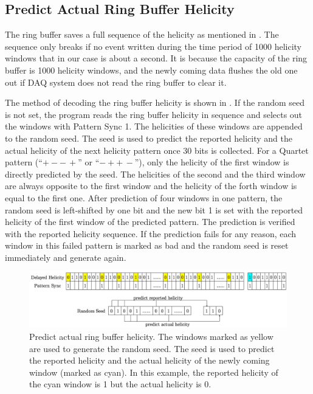\subsection{Predict Actual Ring Buffer Helicity}
\label{A2S2SS1}

The ring buffer saves a full sequence of the helicity as mentioned in . The sequence only breaks if no event written during the time period of 1000 helicity windows that in our case is about a second. It is because the capacity of the ring buffer is 1000 helicity windows, and the newly coming data flushes the old one out if DAQ system does not read the ring buffer to clear it.

The method of decoding the ring buffer helicity is shown in . If the random seed is not set, the program reads the ring buffer helicity in sequence and selects out the windows with Pattern Sync 1. The helicities of these windows are appended to the random seed. The seed is used to predict the reported helicity and the actual helicity of the next helicity pattern once 30 bits is collected. For a Quartet pattern (``$+--\,+$'' or ``$-++\,-$''), only the helicity of the first window is directly predicted by the seed. The helicities of the second and the third window are always opposite to the first window and the helicity of the forth window is equal to the first one. After prediction of four windows in one pattern, the random seed is left-shifted by one bit and the new bit 1 is set with the reported helicity of the first window of the predicted pattern. The prediction is verified with the reported helicity sequence. If the prediction fails for any reason, each window in this failed pattern is marked as bad and the random seed is reset immediately and generate again.

\begin{figure}[tb!]
  \centering
  \includegraphics[width=\textwidth]{figs/ring-buffer-helicity.png}
  \caption[Predict actual ring buffer helicity.]{Predict actual ring buffer helicity. The windows marked as yellow are used to generate the random seed. The seed is used to predict the reported helicity and the actual helicity of the newly coming window (marked as cyan). In this example, the reported helicity of the cyan window is 1 but the actual helicity is 0. \label{A2S2F2}}
\end{figure}


